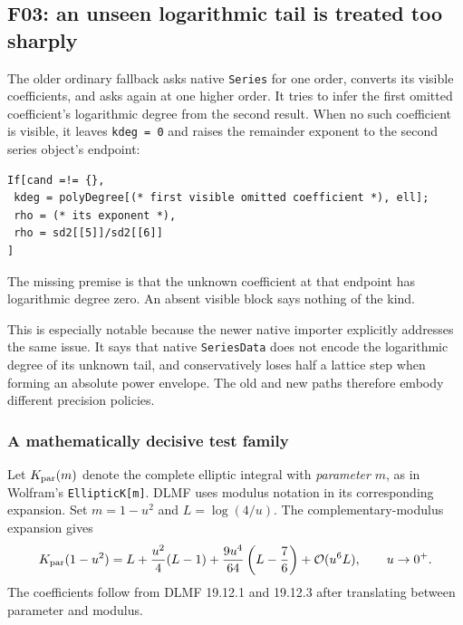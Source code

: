\subsection{F03: an unseen logarithmic tail is treated too sharply}
\label{sec:f03}


\cite{core,native}

The older ordinary fallback asks native \texttt{Series} for one order, converts its visible coefficients, and asks again at one higher order. It tries to infer the first omitted coefficient's logarithmic degree from the second result. When no such coefficient is visible, it leaves \texttt{kdeg = 0} and raises the remainder exponent to the second series object's endpoint:
\begin{lstlisting}
If[cand =!= {},
 kdeg = polyDegree[(* first visible omitted coefficient *), ell];
 rho = (* its exponent *),
 rho = sd2[[5]]/sd2[[6]]
]
\end{lstlisting}
The missing premise is that the unknown coefficient at that endpoint has logarithmic degree zero. An absent visible block says nothing of the kind.

This is especially notable because the newer native importer explicitly addresses the same issue. It says that native \texttt{SeriesData} does not encode the logarithmic degree of its unknown tail, and conservatively loses half a lattice step when forming an absolute power envelope. The old and new paths therefore embody different precision policies.\cite{native}

\subsubsection*{A mathematically decisive test family}

Let $K_{\rm par}(m)$ denote the complete elliptic integral with \emph{parameter} $m$, as in Wolfram's \texttt{EllipticK[m]}. DLMF uses modulus notation in its corresponding expansion. Set $m=1-u^2$ and $L=\log(4/u)$. The complementary-modulus expansion gives
\begin{equation}\label{eq:elliptic}
 K_{\rm par}(1-u^2)
 =L+\frac{u^2}{4}(L-1)
  +\frac{9u^4}{64}\left(L-\frac76\right)
  +\mathcal O(u^6L),\qquad u\to0^+.
\end{equation}
The coefficients follow from DLMF 19.12.1 and 19.12.3 after translating between parameter and modulus.\cite{dlmf-elliptic,wl-elliptick}

